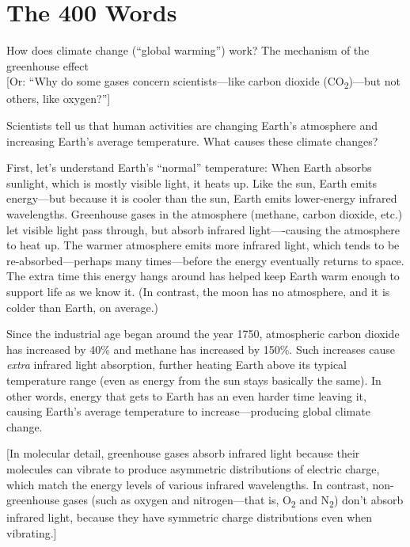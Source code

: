 \chapter{The 400 Words}
\label{chap:400}

\begin{center}
How does climate change (``global warming'') work?  The mechanism of the
greenhouse effect \\\relax
[Or: ``Why do some gases concern scientists---like carbon dioxide
(CO\textsubscript{2})---but not others, like oxygen?'']
\end{center}

Scientists tell us that human activities are changing Earth's atmosphere and
increasing Earth's average temperature. What causes these climate changes?

First, let's understand Earth's ``normal'' temperature: When Earth absorbs
sunlight, which is mostly visible light, it heats up. Like the sun, Earth emits
energy---but because it is cooler than the sun, Earth emits lower-energy infrared
wavelengths. Greenhouse gases in the atmosphere (methane, carbon dioxide, etc.)
let visible light pass through, but absorb infrared light––-causing the
atmosphere to heat up. The warmer atmosphere emits more infrared light, which
tends to be re-absorbed---perhaps many times---before the energy eventually
returns to space. The extra time this energy hangs around has helped keep Earth
warm enough to support life as we know it. (In contrast, the moon has no
atmosphere, and it is colder than Earth, on average.)

Since the industrial age began around the year 1750, atmospheric carbon dioxide
has increased by 40\% and methane has increased by 150\%. Such increases cause
\emph{extra} infrared light absorption, further heating Earth above its typical
temperature range (even as energy from the sun stays basically the same).  In
other words, energy that gets to Earth has an even harder time leaving it,
causing Earth's average temperature to increase---producing global climate
change. 

[In molecular detail, greenhouse gases absorb infrared light because their
molecules can vibrate to produce asymmetric distributions of electric charge,
which match the energy levels of various infrared wavelengths. In contrast,
non-greenhouse gases (such as oxygen and nitrogen––that is, O\textsubscript{2}
and N\textsubscript{2}) don't absorb infrared light, because they have symmetric
charge distributions even when vibrating.]

